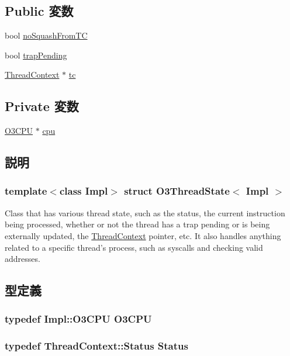 \subsection*{Public 変数}
\begin{DoxyCompactItemize}
\item 
bool \hyperlink{structO3ThreadState_afdfc33b720511483d84f7098ab6ba075}{noSquashFromTC}
\item 
bool \hyperlink{structO3ThreadState_aa9f948437524f88e51afd737df505200}{trapPending}
\item 
\hyperlink{classThreadContext}{ThreadContext} $\ast$ \hyperlink{structO3ThreadState_a4455a4759e69e5ebe68ae7298cbcc37d}{tc}
\end{DoxyCompactItemize}
\subsection*{Private 変数}
\begin{DoxyCompactItemize}
\item 
\hyperlink{structO3ThreadState_a44622cf06940413482836cb62931ac3f}{O3CPU} $\ast$ \hyperlink{structO3ThreadState_a1379cf882a12ac6fc9eba5da7c84b18b}{cpu}
\end{DoxyCompactItemize}


\subsection{説明}
\subsubsection*{template$<$class Impl$>$ struct O3ThreadState$<$ Impl $>$}

Class that has various thread state, such as the status, the current instruction being processed, whether or not the thread has a trap pending or is being externally updated, the \hyperlink{classThreadContext}{ThreadContext} pointer, etc. It also handles anything related to a specific thread's process, such as syscalls and checking valid addresses. 

\subsection{型定義}
\hypertarget{structO3ThreadState_a44622cf06940413482836cb62931ac3f}{
\subsubsection[{O3CPU}]{\setlength{\rightskip}{0pt plus 5cm}typedef Impl::O3CPU {\bf O3CPU}}}
\label{structO3ThreadState_a44622cf06940413482836cb62931ac3f}
\hypertarget{structO3ThreadState_a3af29dcea6d2bbb0a1de56f02ec789f1}{
\subsubsection[{Status}]{\setlength{\rightskip}{0pt plus 5cm}typedef {\bf ThreadContext::Status} {\bf Status}}}
\label{structO3ThreadState_a3af29dcea6d2bbb0a1de56f02ec789f1}


